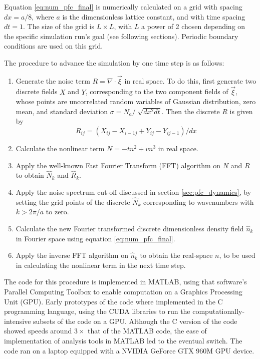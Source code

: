 Equation \ref{eq:num_pfc_final} is numerically calculated on a grid with spacing $dx=a/8$, where $a$ is the dimensionless lattice constant, and with time spacing $dt=1$. The size of the grid is $L \times L$, with $L$ a power of 2 chosen depending on the specific simulation run's goal (see following sections). Periodic boundary conditions are used on this grid.

The procedure to advance the simulation by one time step is as follows:
\begin{enumerate}
\item Generate the noise term $R=\nabla \cdot \vec\xi$ in real space. To do this, first generate two discrete fields $X$ and $Y$, corresponding to the two component fields of $\vec\xi$, whose points are uncorrelated random variables of Gaussian distribution, zero mean, and standard deviation $\sigma = N_a/\sqrt[]{dx^2dt}$. Then the discrete $R$ is given by
\begin{equation}
R_{ij}=(X_{ij}-X_{i-1j}+Y_{ij}-Y_{ij-1})/dx
\end{equation}
\item Calculate the nonlinear term $N=-tn^2+vn^3$ in real space.
\item Apply the well-known Fast Fourier Transform (FFT) algorithm on $N$ and $R$ to obtain $\hat{N}_k$ and $\hat{R}_k$.
\item Apply the noise spectrum cut-off discussed in section \ref{sec:pfc_dynamics}, by setting the grid points of the discrete $\hat{N}_k$ corresponding to wavenumbers with $k>2\pi/a$ to zero.
\item Calculate the new Fourier transformed discrete dimensionless density field $\hat{n}_k$ in Fourier space using equation \ref{eq:num_pfc_final}.
\item Apply the inverse FFT algorithm on $\hat{n}_k$ to obtain the real-space $n$, to be used in calculating the nonlinear term in the next time step.
\end{enumerate}

The code for this procedure is implemented in MATLAB, using that software's Parallel Computing Toolbox to enable computation on a Graphics Processing Unit (GPU). Early prototypes of the code where implemented in the C programming language, using the CUDA libraries to run the computationally-intensive subsets of the code on a GPU. Although the C version of the code showed speeds around $3\times$ that of the MATLAB code, the ease of implementation of analysis tools in MATLAB led to the eventual switch. The code ran on a laptop equipped with a NVIDIA GeForce GTX 960M GPU device.


